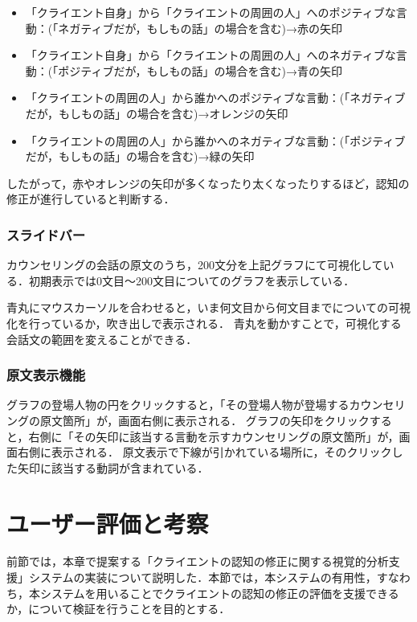 \documentclass[shuuron]{kuee}
\begin{document}
\begin{itemize}
  \item 「クライエント自身」から「クライエントの周囲の人」へのポジティブな言動：(「ネガティブだが，もしもの話」の場合を含む)→赤の矢印
  \item 「クライエント自身」から「クライエントの周囲の人」へのネガティブな言動：(「ポジティブだが，もしもの話」の場合を含む)→青の矢印
  \item 「クライエントの周囲の人」から誰かへのポジティブな言動：(「ネガティブだが，もしもの話」の場合を含む)→オレンジの矢印
  \item 「クライエントの周囲の人」から誰かへのネガティブな言動：(「ポジティブだが，もしもの話」の場合を含む)→緑の矢印
\end{itemize}

したがって，赤やオレンジの矢印が多くなったり太くなったりするほど，認知の修正が進行していると判断する．

\subsubsection{スライドバー}

カウンセリングの会話の原文のうち，200文分を上記グラフにて可視化している．初期表示では0文目〜200文目についてのグラフを表示している．

青丸にマウスカーソルを合わせると，いま何文目から何文目までについての可視化を行っているか，吹き出しで表示される．
青丸を動かすことで，可視化する会話文の範囲を変えることができる．


\subsubsection{原文表示機能}

グラフの登場人物の円をクリックすると，「その登場人物が登場するカウンセリングの原文箇所」が，画面右側に表示される．
グラフの矢印をクリックすると，右側に「その矢印に該当する言動を示すカウンセリングの原文箇所」が，画面右側に表示される．
原文表示で下線が引かれている場所に，そのクリックした矢印に該当する動詞が含まれている．


\section{ユーザー評価と考察} %

前節では，本章で提案する「クライエントの認知の修正に関する視覚的分析支援」システムの実装について説明した．本節では，本システムの有用性，すなわち，本システムを用いることでクライエントの認知の修正の評価を支援できるか，について検証を行うことを目的とする．
\end{document}
